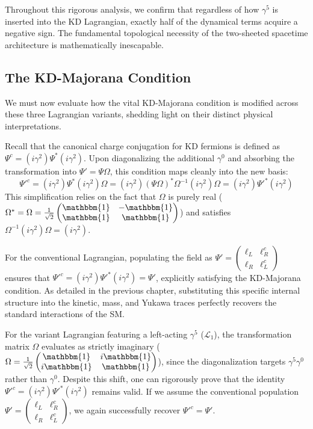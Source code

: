 Throughout this rigorous analysis, we confirm that regardless of how $\gamma^5$ is inserted into the KD Lagrangian, exactly half of the dynamical terms acquire a negative sign. The fundamental topological necessity of the two-sheeted spacetime architecture is mathematically inescapable.

\subsection{The KD-Majorana Condition}\label{subsec:KD_Majorana_diff_Lagrangian}

We must now evaluate how the vital KD-Majorana condition is modified across these three Lagrangian variants, shedding light on their distinct physical interpretations. 

Recall that the canonical charge conjugation for KD fermions is defined as $\Psi^c=(i\gamma^2)\Psi^*(i\gamma^2)$. Upon diagonalizing the additional $\gamma^0$ and absorbing the transformation into $\Psi'=\Psi\Omega$, this condition maps cleanly into the new basis:
\[ \Psi'^c=(i\gamma^2)\Psi^*(i\gamma^2)\Omega=(i\gamma^2)(\Psi\Omega)^*\Omega^{-1}(i\gamma^2)\Omega=(i\gamma^2)\Psi'^*(i\gamma^2)\]
This simplification relies on the fact that $\Omega$ is purely real ($\Omega^*=\Omega=\frac{1}{\sqrt{2}}\begin{pmatrix} \mathbbm{1}&-\mathbbm{1}\\ \mathbbm{1}&\mathbbm{1} \end{pmatrix}$) and satisfies $\Omega^{-1}(i\gamma^2)\Omega=(i\gamma^2)$.

For the conventional Lagrangian, populating the field as $\Psi'=\begin{pmatrix}\ell_L& \ell_R^c\\ \ell_R & \ell_L^c  \end{pmatrix}$ ensures that $\Psi'^c=(i\gamma^2)\Psi'^*(i\gamma^2)=\Psi'$, explicitly satisfying the KD-Majorana condition. As detailed in the previous chapter, substituting this specific internal structure into the kinetic, mass, and Yukawa traces perfectly recovers the standard interactions of the SM. 

For the variant Lagrangian featuring a left-acting $\gamma^5$ ($\mathcal{L}_1$), the transformation matrix $\Omega$ evaluates as strictly imaginary ($\Omega=\frac{1}{\sqrt{2}}\begin{pmatrix} \mathbbm{1}&i\mathbbm{1}\\ i\mathbbm{1}&\mathbbm{1} \end{pmatrix}$), since the diagonalization targets $\gamma^5\gamma^0$ rather than $\gamma^0$. Despite this shift, one can rigorously prove that the identity $\Psi'^c=(i\gamma^2)\Psi'^*(i\gamma^2)$ remains valid. If we assume the conventional population $\Psi'=\begin{pmatrix}\ell_L& \ell_R^c\\ \ell_R & \ell_L^c  \end{pmatrix}$, we again successfully recover $\Psi'^c=\Psi'$. 

